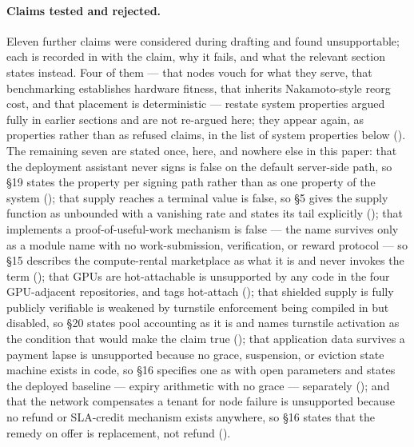 \paragraph{Claims tested and rejected.} Eleven further claims were considered during drafting and
found unsupportable; each is recorded in  with the claim, why it fails, and what
the relevant section states instead. Four of them — that nodes vouch for what they serve, that
benchmarking establishes hardware fitness, that \PoN inherits Nakamoto-style reorg cost, and that
placement is deterministic — restate system properties argued fully in earlier sections and are not
re-argued here; they appear again, as properties rather than as refused claims, in the list of system
properties below (). The remaining seven are stated once, here, and nowhere else in
this paper: that the deployment assistant never signs is false on the default server-side path, so §19
states the property per signing path rather than as one property of the system
(); that supply reaches a terminal value is false, so §5 gives the supply
function as unbounded with a vanishing rate and states its tail explicitly
(); that \Flux implements a proof-of-useful-work mechanism is false — the
name survives only as a module name with no work-submission, verification, or reward protocol — so §15
describes the compute-rental marketplace as what it is and never invokes the term
(); that GPUs are hot-attachable is unsupported by any code in the four
GPU-adjacent repositories,  and tags
hot-attach \vision{} (); that shielded supply is fully publicly verifiable is
weakened by turnstile enforcement being compiled in but disabled, so §20 states pool accounting as it
is and names turnstile activation as the condition that would make the claim true
(); that application data survives a payment lapse is unsupported because no
grace, suspension, or eviction state machine exists in code, so §16 specifies one as \planned{} with
open parameters and states the deployed baseline — expiry arithmetic with no grace — separately
(); and that the network compensates a tenant for node failure is
unsupported because no refund or SLA-credit mechanism exists anywhere, so §16 states that the remedy on
offer is replacement, not refund ().

